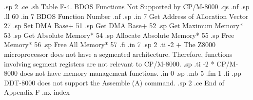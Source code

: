 .sp 2
.ce
.sh
Table F-4.  BDOS Functions Not Supported by CP/M-8000
.qs
.nf
.sp
.ll 60
.in 7
         BDOS Function                   Number
.nf
.sp
.in 7 
Get Address of Allocation Vector           27
.sp
Set DMA Base+                              51
.sp
Get DMA Base+                              52
.sp
Get Maximum Memory*                        53
.sp
Get Absolute Memory*                       54
.sp
Allocate Absolute Memory*                  55
.sp
Free Memory*                               56
.sp
Free All Memory*                           57
.fi
.in 7
.sp 2
.ti -2
+ The Z8000 microprocessor does not have a segmented 
architecture.  Therefore, functions involving segment registers are not 
relevant to CP/M-8000.
.sp
.ti -2
* CP/M-8000 does not have memory management functions.
.in 0
.sp
.mb 5
.fm 1
.fi
.pp
DDT-8000 does not support the Assemble (A) command.
.sp 2
.ce
End of Appendix F
.nx index

